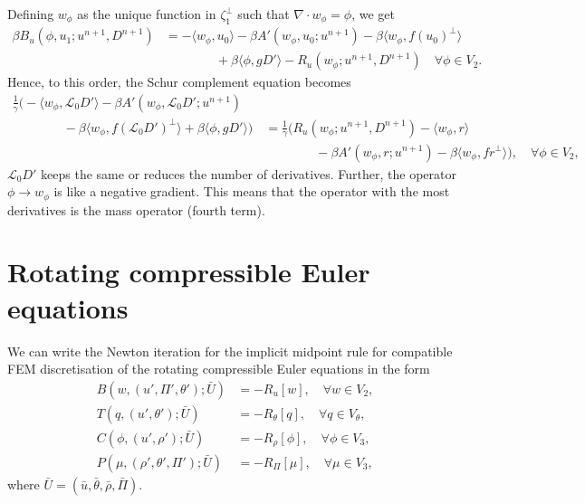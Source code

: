 \documentclass{article}
\begin{document}
Defining $w_\phi$ as the unique function in $\zeta_1^{\perp}$ such
that $\nabla\cdot w_\phi=\phi$, we get
\begin{align}
  \nonumber
  \beta B_u(\phi, u_1; u^{n+1},D^{n+1})
  & = 
  -\langle w_{\phi}, u_0 \rangle - \beta A'(w_\phi, u_0; u^{n+1})
  - \beta\langle w_\phi, f(u_0)^{\perp}\rangle \\
  & \qquad\qquad
  + \beta\langle \phi, gD'\rangle
  -R_u(w_\phi;u^{n+1},D^{n+1})
  \quad \forall \phi \in V_2.
\end{align}
Hence, to this order, the Schur complement equation becomes
\begin{align}
  \nonumber
  \frac{1}{\gamma}\Big(-\langle w_{\phi}, \mathcal{L}_0D' \rangle 
  - \beta A'(w_\phi, \mathcal{L}_0D'; u^{n+1}) \quad & \\
  \nonumber
\qquad  \qquad   - \beta\langle w_\phi, f(\mathcal{L}_0D')^{\perp}\rangle
  + \beta\langle \phi, gD'\rangle\Big)
  &= \frac{1}{\gamma}\Big(R_u(w_\phi;u^{n+1},D^{n+1})
  -\langle w_{\phi}, r \rangle  \\
  & \qquad\qquad -\beta A'(w_\phi, r; u^{n+1})
  - \beta\langle w_\phi, fr^{\perp}\rangle\Big),
  \quad \forall \phi \in V_2,
\end{align}
$\mathcal{L}_0D'$ keeps the same or reduces the number of derivatives.
Further, the operator $\phi\to w_\phi$ is like a negative gradient.
This means that the operator with the most derivatives is the
mass operator (fourth term).

\section{Rotating compressible Euler equations}

We can write the Newton iteration for the implicit midpoint rule for
compatible FEM discretisation of the rotating compressible Euler equations
in the form
\begin{align}
  B(w,(u',\Pi',\theta'); \bar{U}) & = -R_u[w], \quad \forall w\in V_2, \\
  T(q,(u',\theta'); \bar{U}) & = -R_\theta[q], \quad \forall q\in V_\theta, \\
  C(\phi,(u',\rho'); \bar{U}) & = -R_\rho[\phi], \quad \forall \phi \in V_3, \\
  P(\mu,(\rho',\theta',\Pi'); \bar{U}) & = -R_\Pi[\mu], \quad
  \forall \mu \in V_3,
\end{align}
where $\bar{U}=(\bar{u},\bar{\theta},\bar{\rho},\bar{\Pi})$.
\end{document}
